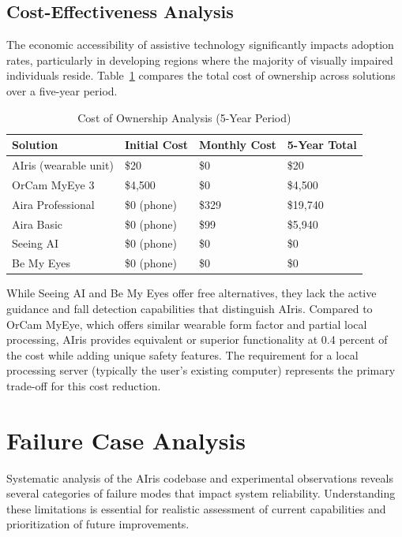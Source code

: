 \documentclass[12pt,a4paper]{report}
\begin{document}
\subsection{Cost-Effectiveness Analysis}

The economic accessibility of assistive technology significantly impacts adoption rates, particularly in developing regions where the majority of visually impaired individuals reside. Table~\ref{tab:cost_analysis} compares the total cost of ownership across solutions over a five-year period.

\begin{table}[H]
\centering
\caption{Cost of Ownership Analysis (5-Year Period)}
\label{tab:cost_analysis}
\begin{tabular}{@{}llll@{}}
\toprule
\textbf{Solution} & \textbf{Initial Cost} & \textbf{Monthly Cost} & \textbf{5-Year Total} \\ \midrule
AIris (wearable unit) & \$20 & \$0 & \$20 \\
OrCam MyEye 3 & \$4,500 & \$0 & \$4,500 \\
Aira Professional & \$0 (phone) & \$329 & \$19,740 \\
Aira Basic & \$0 (phone) & \$99 & \$5,940 \\
Seeing AI & \$0 (phone) & \$0 & \$0 \\
Be My Eyes & \$0 (phone) & \$0 & \$0 \\ \bottomrule
\end{tabular}
\end{table}

While Seeing AI and Be My Eyes offer free alternatives, they lack the active guidance and fall detection capabilities that distinguish AIris. Compared to OrCam MyEye, which offers similar wearable form factor and partial local processing, AIris provides equivalent or superior functionality at 0.4 percent of the cost while adding unique safety features. The requirement for a local processing server (typically the user's existing computer) represents the primary trade-off for this cost reduction.


\section{Failure Case Analysis}

Systematic analysis of the AIris codebase and experimental observations reveals several categories of failure modes that impact system reliability. Understanding these limitations is essential for realistic assessment of current capabilities and prioritization of future improvements.
\end{document}
